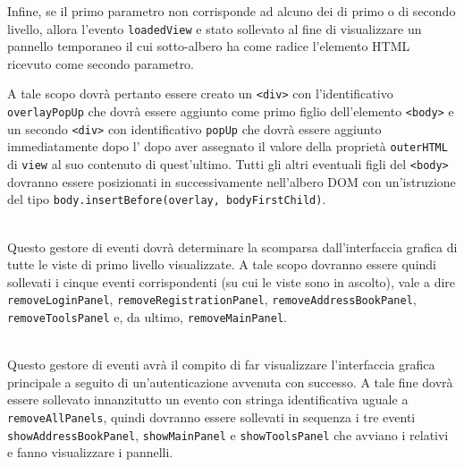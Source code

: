 \begin{description}
Infine, se il primo parametro non corrisponde ad alcuno dei  di primo o di secondo livello, allora l'evento \verb'loadedView' e stato sollevato al fine di visualizzare un pannello temporaneo il cui sotto-albero ha come radice l'elemento HTML ricevuto come secondo parametro.

A tale scopo dovrà pertanto essere creato un \verb'<div>' con l'identificativo \verb'overlayPopUp' che dovrà essere aggiunto come primo figlio dell'elemento \verb'<body>' e un secondo \verb'<div>' con identificativo \verb'popUp' che dovrà essere aggiunto immediatamente dopo l' dopo aver assegnato il valore della proprietà \verb'outerHTML' di \verb'view' al suo contenuto di quest'ultimo. Tutti gli altri eventuali figli del \verb'<body>' dovranno essere posizionati in successivamente nell'albero DOM con un'istruzione del tipo \verb'body.insertBefore(overlay, bodyFirstChild)'.

\item{}\\
Questo gestore di eventi dovrà determinare la scomparsa dall'interfaccia grafica di tutte le viste di primo livello visualizzate. A tale scopo dovranno essere quindi sollevati i cinque eventi corrispondenti (su cui le viste sono in ascolto), vale a dire \verb'removeLoginPanel', \verb'removeRegistrationPanel', \verb'removeAddressBookPanel', \verb'removeToolsPanel' e, da ultimo, \verb'removeMainPanel'.


\item{}\\
Questo gestore di eventi avrà il compito di far visualizzare l'interfaccia grafica principale a seguito di un'autenticazione avvenuta con successo. A tale fine dovrà essere sollevato innanzitutto un evento con stringa identificativa uguale a \verb'removeAllPanels', quindi dovranno essere sollevati in sequenza i tre eventi \verb'showAddressBookPanel', \verb'showMainPanel' e \verb'showToolsPanel' che avviano i relativi  e fanno visualizzare i pannelli.

\end{description}


